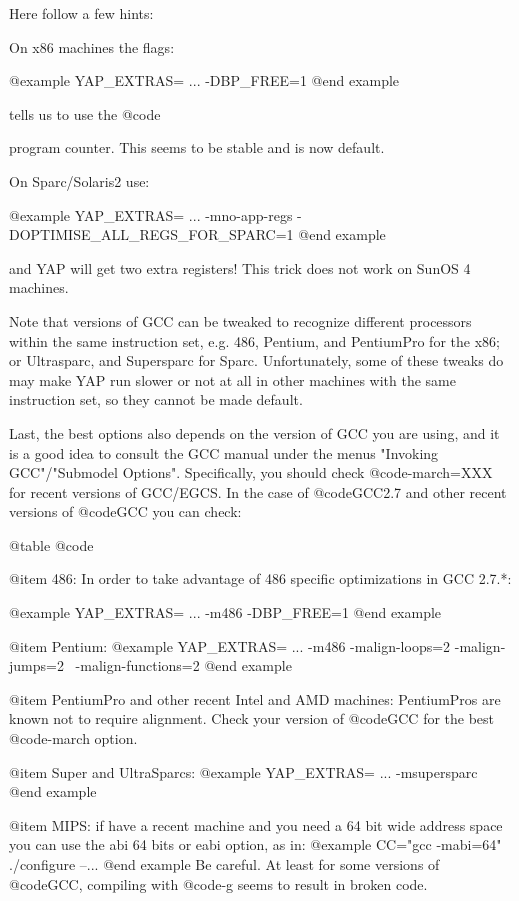 Here follow a few hints:

On x86 machines the flags:

@example
YAP_EXTRAS= ... -DBP_FREE=1
@end example

tells us to use the @code{%
program counter. This seems to be stable and is now default.

On  Sparc/Solaris2 use:

@example
YAP_EXTRAS= ...   -mno-app-regs -DOPTIMISE_ALL_REGS_FOR_SPARC=1
@end example

and YAP will get two extra registers! This trick does not work on
SunOS 4 machines.

Note that versions of GCC can be tweaked to recognize different
processors within the same instruction set, e.g. 486, Pentium, and
PentiumPro for the x86; or Ultrasparc, and Supersparc for
Sparc. Unfortunately, some of these tweaks do may make YAP run slower or
not at all in other machines with the same instruction set, so they
cannot be made default.

Last, the best options also depends on the version of GCC you are using, and
it is a good idea to consult the GCC manual under the menus "Invoking
GCC"/"Submodel Options". Specifically, you should check
@code{-march=XXX} for recent versions of GCC/EGCS. In the case of
@code{GCC2.7} and other recent versions of @code{GCC} you can check:

@table @code

@item 486:
In order to take advantage of 486 specific optimizations in GCC 2.7.*:

@example
YAP_EXTRAS= ... -m486 -DBP_FREE=1
@end example

@item Pentium:
@example
YAP_EXTRAS= ... -m486 -malign-loops=2 -malign-jumps=2 \
                      -malign-functions=2
@end example

@item PentiumPro and other recent Intel and AMD machines:
PentiumPros are known not to require alignment. Check your version of
@code{GCC} for the best @code{-march} option.

@item Super and UltraSparcs:
@example
YAP_EXTRAS= ... -msupersparc
@end example

@item MIPS: if have a recent machine and you need a 64 bit wide address
space you can use the abi 64 bits or eabi option, as in:
@example
CC="gcc -mabi=64" ./configure --...
@end example
Be careful. At least for some versions of @code{GCC}, compiling with
@code{-g} seems to result in broken code.

}
